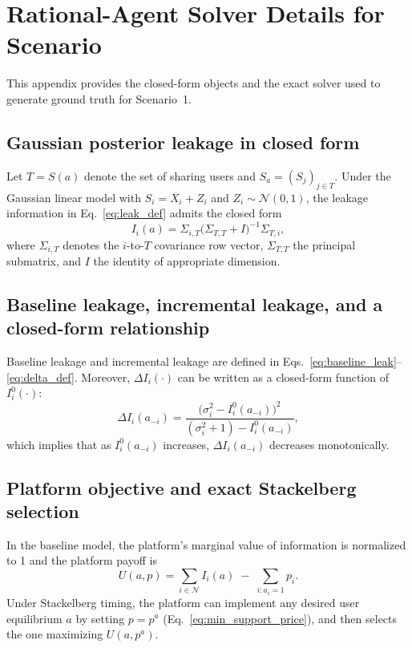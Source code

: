 \section{Rational-Agent Solver Details for Scenario}
\label{app:rational_agent_solver}

This appendix provides the closed-form objects and the exact solver used to generate ground truth for Scenario~1.

\subsection{Gaussian posterior leakage in closed form}
Let $T=S(a)$ denote the set of sharing users and $S_a=(S_j)_{j\in T}$.
Under the Gaussian linear model with $S_i=X_i+Z_i$ and $Z_i\sim\mathcal{N}(0,1)$,
the leakage information in Eq.~\eqref{eq:leak_def} admits the closed form
\begin{equation}
I_i(a)=\Sigma_{i,T}\big(\Sigma_{T,T}+I\big)^{-1}\Sigma_{T,i},
\label{eq:leak_closed_form_app}
\end{equation}
where $\Sigma_{i,T}$ denotes the $i$-to-$T$ covariance row vector, $\Sigma_{T,T}$ the principal submatrix, and $I$ the identity of appropriate dimension.

\subsection{Baseline leakage, incremental leakage, and a closed-form relationship}
Baseline leakage and incremental leakage are defined in Eqs.~\eqref{eq:baseline_leak}--\eqref{eq:delta_def}.
Moreover, $\Delta I_i(\cdot)$ can be written as a closed-form function of $I_i^{0}(\cdot)$:
\begin{equation}
\Delta I_i(a_{-i})
=
\frac{\big(\sigma_i^2-I_i^{0}(a_{-i})\big)^2}{(\sigma_i^2+1)-I_i^{0}(a_{-i})},
\label{eq:deltaI_closed_form_app}
\end{equation}
which implies that as $I_i^{0}(a_{-i})$ increases, $\Delta I_i(a_{-i})$ decreases monotonically.

\subsection{Platform objective and exact Stackelberg selection}
In the baseline model, the platform's marginal value of information is normalized to 1 and the platform payoff is
\begin{equation}
U(a,p)=\sum_{i\in\mathcal{N}} I_i(a)\;-\;\sum_{i:a_i=1} p_i.
\label{eq:platform_obj_app}
\end{equation}
Under Stackelberg timing, the platform can implement any desired user equilibrium $a$ by setting $p=p^a$ (Eq.~\eqref{eq:min_support_price}), and then selects the one maximizing $U(a,p^a)$.


